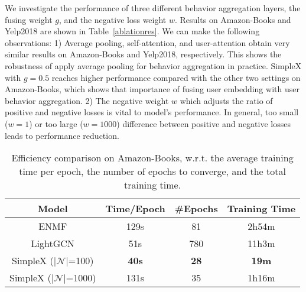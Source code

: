 \documentclass[sigconf,authorversion]{acmart}
\begin{document}
We investigate the performance of three different behavior aggregation layers, the fusing weight $g$, and the negative loss weight $w$. Results on Amazon-Books and Yelp2018 are shown in Table~\ref{ablationres}. We can make the following observations: 1) Average pooling, self-attention, and user-attention obtain very similar results on Amazon-Books and Yelp2018, respectively. This shows the robustness of apply average pooling for behavior aggregation in practice. SimpleX with $g=0.5$ reaches higher performance compared with the other two settings on Amazon-Books, which shows that importance of fusing user embedding with user behavior aggregation. 2) The negative weight $w$ which adjusts the ratio of positive and negative losses is vital to model's performance. In general, too small ($w=1$) or too large ($w=1000$) difference between positive and negative losses leads to performance reduction. 





\begin{table}[!t]
    \centering
    \setlength{\tabcolsep}{1ex}
    \caption{Efficiency comparison on Amazon-Books, w.r.t. the average training time per epoch, the number of epochs to converge, and the total training time.}
\begin{tabular}{c|c|c|c}
\hline
Model       & Time/Epoch & \#Epochs & Training Time \\ \hline
\hline
ENMF        &      129s     &   81   &   2h54m        \\ 
LightGCN    &     51s   &   780   &   11h3m      \\ 
SimpleX ($|\mathcal{N}|$=100)    &     \textbf{40s}       &   \textbf{28}   &    \textbf{19m} \\
SimpleX ($|\mathcal{N}|$=1000)    &     131s       &   {35}   &    {1h16m}     \\ \hline
\end{tabular}
    
    \label{efficiencycompare}
\end{table}
\end{document}
